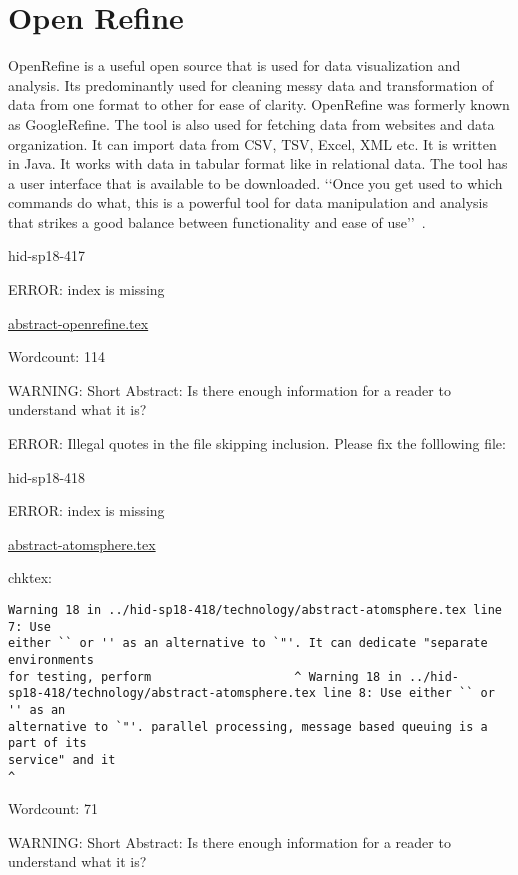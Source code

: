 \section{Open Refine}
OpenRefine is a useful open source that is used for data visualization
and analysis.  Its predominantly used for cleaning messy data and
transformation of data from one format to other for ease of clarity.
OpenRefine was formerly known as GoogleRefine. The tool is also used
for fetching data from websites and data organization. It can import data from 
CSV, TSV, Excel, XML etc. It is written
in Java. It works with data in tabular format like in relational
data. The tool has a user interface that is available to be downloaded. 
‘‘Once you get used to which commands do what, this is a
powerful tool for data manipulation and analysis that strikes a good
balance between functionality and ease of
use’’~\cite{hid-sp18-417-openrefine}.



\begin{IU}

hid-sp18-417

ERROR: index is missing

\href{https://github.com/cloudmesh-community/hid-sp18-417/blob/master//technology/abstract-openrefine.tex}{abstract-openrefine.tex}

 

Wordcount: 114

WARNING: Short Abstract: Is there enough information for a reader to understand what it is?

\end{IU}

ERROR: Illegal quotes in the file skipping inclusion. Please fix the folllowing file:

\begin{IU}

hid-sp18-418

ERROR: index is missing

\href{https://github.com/cloudmesh-community/hid-sp18-418/blob/master//technology/abstract-atomsphere.tex}{abstract-atomsphere.tex}

 
chktex:
\begin{tiny}
\begin{verbatim}
Warning 18 in ../hid-sp18-418/technology/abstract-atomsphere.tex line 7: Use
either `` or '' as an alternative to `"'. It can dedicate "separate environments
for testing, perform                    ^ Warning 18 in ../hid-
sp18-418/technology/abstract-atomsphere.tex line 8: Use either `` or '' as an
alternative to `"'. parallel processing, message based queuing is a part of its
service" and it
^
\end{verbatim}
\end{tiny}

Wordcount: 71

WARNING: Short Abstract: Is there enough information for a reader to understand what it is?

\end{IU}

